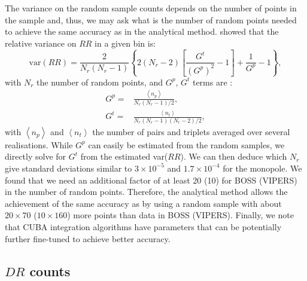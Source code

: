 \documentclass{aa}
\newcommand{\ev}[1]{\left\langle #1 \right\rangle}
\begin{document}
The variance on the random sample counts depends on the number of points in the sample and, thus, we may ask what is the number of random points needed to achieve the same accuracy as in the analytical method. \cite{keihanen2019estimating} showed that the relative variance on $RR$ in a given bin is:
%
\begin{equation}
    \textrm{var}(RR) = \frac{2}{N_r(N_r-1)}\left\{ 2(N_r-2)\left[ \frac{G^t}{(G^p)^2} - 1\right] + \frac{1}{G^p}- 1 \right\}
,\end{equation}
%
with $N_r$ the number of random points, and $G^p$, $G^t$ terms are \citep{landy1993bias}:
%
\begin{align}
    G^p =& \frac{\ev{n_p}}{N_r(N_r-1)/2},\\
    G^t =& \frac{\ev{n_t}}{N_r(N_r-1)(N_r-2)/2},
\end{align}
%
with $\ev{n_p}$ and $\ev{n_t}$ the number of pairs and triplets averaged over several realisations. While $G^p$ can easily be estimated from the random samples, we directly solve for $G^t$ from the estimated var($RR$). We can then deduce which $N_r$ give standard deviations similar to $3\times10^{-5}$ and $1.7\times10^{-4}$ for the monopole. We found that we need an additional factor of at least 20 (10) for BOSS (VIPERS) in the number of random points. Therefore, the analytical method allows the achievement of the same accuracy as by using a random sample with about $20\times70$ ($10\times160$) more points than data in BOSS (VIPERS). Finally, we note that \textsc{CUBA} integration algorithms have parameters that can be potentially further fine-tuned to achieve better accuracy.

\subsection{$DR$ counts}
\end{document}
